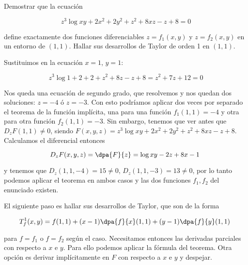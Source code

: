 \begin{problem}[16] Demostrar que la ecuación 

\[ z^3 \log xy + 2x^2 + 2y^2 +z^2 + 8xz - z  + 8 = 0 \]

define exactamente dos funciones diferenciables $z=f_1(x,y)$ y $z=f_2(x,y)$ en un entorno de $(1,1)$. Hallar sus desarrollos de Taylor de orden 1 en $(1,1)$.
\solution

Sustituimos en la ecuación $x=1$, $y=1$:

\[ z^3 \log 1 + 2+ 2 +z^2 + 8z - z  + 8 = z^2 + 7z + 12 = 0 \]

Nos queda una ecuación de segundo grado, que resolvemos y nos quedan dos soluciones: $z=-4$ ó $z=-3$. Con esto podríamos aplicar dos veces por separado el teorema de la función implícita, una para una función $f_1(1,1) = -4$ y otra para otra función $f_2(1,1) = -3$. Sin embargo, tenemos que ver antes que $D_zF(1,1) ≠ 0$, siendo $F(x,y,z) = z^3 \log xy + 2x^2 + 2y^2 +z^2 + 8xz - z  + 8$. Calculamos el diferencial entonces

\[  D_zF(x,y,z) = \dpa{F}{z} = \log xy - 2z + 8x-1 \]

y tenemos que $D_z(1,1,-4) = 15 ≠ 0$, $D_z(1,1,-3) = 13 ≠ 0$, por lo tanto podemos aplicar el teorema en ambos casos y las dos funciones $f_1, f_2$ del enunciado existen. 

El siguiente paso es hallar sus desarrollos de Taylor, que son de la forma

\[ T_f^1(x,y) = f(1,1) + (x-1)\dpa{f}{x}(1,1) + (y-1) \dpa{f}{y} (1,1) \]

para $f=f_1$ o $f=f_2$ según el caso. Necesitamos entonces las derivadas parciales con respecto a $x$ e $y$. Para ello podemos aplicar la fórmula del teorema. Otra opción es derivar implícitamente en $F$ con respecto a $x$ e $y$ y despejar. 
\end{problem}


